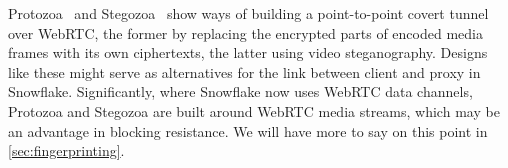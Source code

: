 \documentclass[letterpaper,twocolumn]{article}
\begin{document}
Protozoa~\cite{Barradas2020a}
and Stegozoa~\cite{Figueira2022a}
show ways of building a point-to-point covert tunnel over WebRTC,
the former by replacing the encrypted parts of encoded media frames
with its own ciphertexts,
the latter using video steganography.
Designs like these might serve as alternatives
for the link between client and proxy in Snowflake.
Significantly, where Snowflake now uses WebRTC data channels,
Protozoa and Stegozoa are built around WebRTC media streams,
which may be an advantage in blocking resistance.
We will have more to say on this point in \autoref{sec:fingerprinting}.

\end{document}
